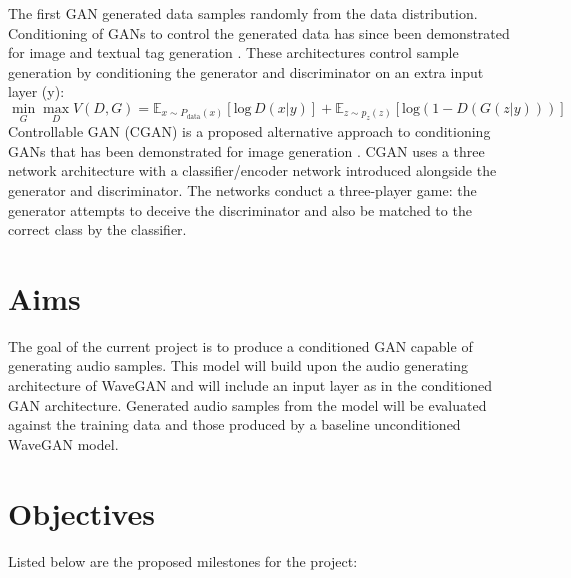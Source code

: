 \documentclass[a4paper, dvipsnames, titlepage]{article}
\begin{document}
The first GAN generated data samples randomly from the data distribution.
Conditioning of GANs to control the generated data has since been demonstrated for image and textual tag generation \citep{2014arXiv1411.1784M}.
These architectures control sample generation by conditioning the generator and discriminator on an extra input layer (y):
\newline
%
\begin{equation}
  \min_{G} \max_{D} V(D,G) = \mathbb{E}_{x \sim P_\mathrm{data}(x)}[\mathrm{log}\,D(x|y)] + \mathbb{E}_{z \sim p_z(z)}[\mathrm{log} (1 - D(G(z|y)))]
\end{equation}
%
\newline
Controllable GAN (CGAN) is a proposed alternative approach to conditioning GANs that has been demonstrated for image generation \citep{2017arXiv170800598L}.
CGAN uses a three network architecture with a classifier/encoder network introduced alongside the generator and discriminator.
The networks conduct a three-player game: the generator attempts to deceive the discriminator and also be matched to the correct class by the classifier.

\newpage

\section{Aims}

The goal of the current project is to produce a conditioned GAN capable of generating audio samples.
This model will build upon the audio generating architecture of WaveGAN and will include an input layer as in the conditioned GAN architecture.
Generated audio samples from the model will be evaluated against the training data and those produced by a baseline unconditioned WaveGAN model.

\newpage

\section{Objectives}

Listed below are the proposed milestones for the project:
\end{document}
